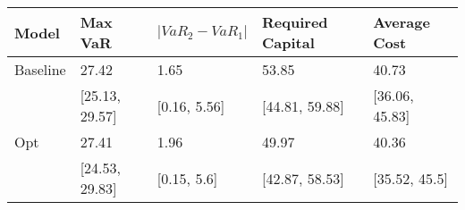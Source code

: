 \begin{tabular}{lllll}
\toprule
   Model &        Max VaR & $|VaR_2 - VaR_1|$ & Required Capital &   Average Cost \\
\midrule
Baseline &          27.42 &              1.65 &            53.85 &          40.73 \\
         & [25.13, 29.57] &      [0.16, 5.56] &   [44.81, 59.88] & [36.06, 45.83] \\
     Opt &          27.41 &              1.96 &            49.97 &          40.36 \\
         & [24.53, 29.83] &       [0.15, 5.6] &   [42.87, 58.53] &  [35.52, 45.5] \\
\bottomrule
\end{tabular}

